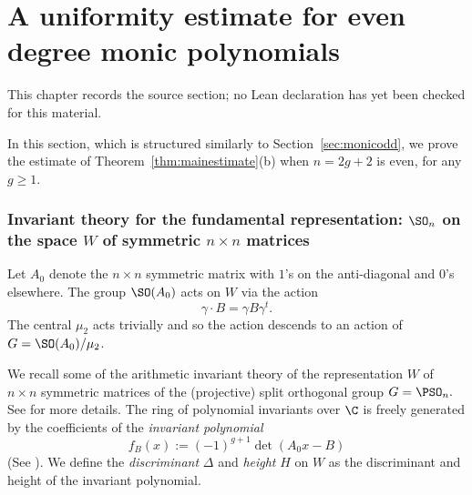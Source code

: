\chapter{A uniformity estimate for even degree monic polynomials}
\label{squarefree-values-polynomial-discriminants-chapter-03}

\begin{remark}
\label{squarefree-values-polynomial-discriminants-chapter-03-source}
This chapter records the source section; no Lean declaration has yet been checked for this material.
\notready
\end{remark}

\label{sec:moniceven}

In this section, which is structured similarly to Section~\ref{sec:monicodd}, we
prove the estimate of Theorem~\ref{thm:mainestimate}(b) when $n=2g+2$
is even, for any $g\geq 1$.

\subsection{Invariant theory for the fundamental representation: $\SO_n$ on the space $W$ of symmetric $n\times n$ matrices}



Let $A_0$ denote the $n\times n$ symmetric matrix with $1$'s on the
anti-diagonal and $0$'s elsewhere. The group $\SO(A_0)$ acts on $W$
via the action
\begin{equation*}
\gamma\cdot B=\gamma B\gamma^t.
\end{equation*}
The central $\mu_2$ acts trivially and so the action descends to an
action of $G=\SO(A_0)/\mu_2$.

We recall some of the arithmetic invariant theory of the
representation $W$ of $n\times n$ symmetric matrices of the
(projective) split orthogonal group $G=\PSO_n.$ See \cite{SW} for more
details. The ring of polynomial invariants over $\C$ is
freely generated by the coefficients of the {\it invariant
  polynomial} $$f_B(x):=(-1)^{g+1}\det(A_0x-B)$$ (See \cite[\S2.1, 2.2]{SW}). We define the {\it
  discriminant} $\Delta$ and {\it height} $H$ on $W$ as the discriminant
and height of the invariant polynomial.

